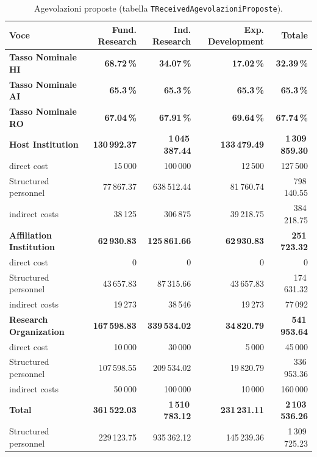 \documentclass{plan4ari_report}
\begin{document}
\begin{table}[H]\centering\small
\caption{Agevolazioni proposte (tabella \texttt{TReceivedAgevolazioniProposte}).}\label{tab:age-prop}
\begin{tabular}{lrrrr}\toprule
\textbf{Voce} & \textbf{Fund. Research} & \textbf{Ind. Research} & \textbf{Exp. Development} & \textbf{Totale} \\\midrule
\textbf{Tasso Nominale HI} & \textbf{68.72\,\%} & \textbf{34.07\,\%} & \textbf{17.02\,\%} & \textbf{32.39\,\%} \\
\textbf{Tasso Nominale AI} & \textbf{65.3\,\%} & \textbf{65.3\,\%} & \textbf{65.3\,\%} & \textbf{65.3\,\%} \\
\textbf{Tasso Nominale RO} & \textbf{67.04\,\%} & \textbf{67.91\,\%} & \textbf{69.64\,\%} & \textbf{67.74\,\%} \\
\textbf{Host Institution} & \textbf{130\,992.37} & \textbf{1\,045\,387.44} & \textbf{133\,479.49} & \textbf{1\,309\,859.30} \\
\quad direct cost & 15\,000 & 100\,000 & 12\,500 & 127\,500 \\
\quad Structured personnel & 77\,867.37 & 638\,512.44 & 81\,760.74 & 798\,140.55 \\
\quad indirect costs & 38\,125 & 306\,875 & 39\,218.75 & 384\,218.75 \\
\textbf{Affiliation Institution} & \textbf{62\,930.83} & \textbf{125\,861.66} & \textbf{62\,930.83} & \textbf{251\,723.32} \\
\quad direct cost & 0 & 0 & 0 & 0 \\
\quad Structured personnel & 43\,657.83 & 87\,315.66 & 43\,657.83 & 174\,631.32 \\
\quad indirect costs & 19\,273 & 38\,546 & 19\,273 & 77\,092 \\
\textbf{Research Organization} & \textbf{167\,598.83} & \textbf{339\,534.02} & \textbf{34\,820.79} & \textbf{541\,953.64} \\
\quad direct cost & 10\,000 & 30\,000 & 5\,000 & 45\,000 \\
\quad Structured personnel & 107\,598.55 & 209\,534.02 & 19\,820.79 & 336\,953.36 \\
\quad indirect costs & 50\,000 & 100\,000 & 10\,000 & 160\,000 \\
\midrule
\textbf{Total} & \textbf{361\,522.03} & \textbf{1\,510\,783.12} & \textbf{231\,231.11} & \textbf{2\,103\,536.26} \\
\quad Structured personnel & 229\,123.75 & 935\,362.12 & 145\,239.36 & 1\,309\,725.23 \\
\bottomrule\end{tabular}
\end{table}
\end{document}
